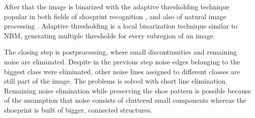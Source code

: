 \documentclass[draft,final]{vutinfth} %
\begin{document}
After that the image is binarized with the adaptive thresholding technique \cite{laine1996multiscale} popular in both fields of shoeprint recognition  \cite{wang2014automatic}, \cite{li2014retrieval} and also of natural image processing \cite{xu2016image}.
Adaptive thresholding is a local binarization technique similar to NBM, generating multiple thresholds for every subregion of an image.
\par
The closing step is postprocessing, where small discontinuities and remaining noise are eliminated.
Despite in the previous step noise edges belonging to the biggest class were eliminated, other noise lines assigned to different classes are still part of the image.
The problems is solved with short line elimination.
Remaining noise elimination while preserving the shoe pattern is possible because of the assumption that noise consists of cluttered small components whereas the shoeprint is built of bigger, connected structures.
\end{document}
